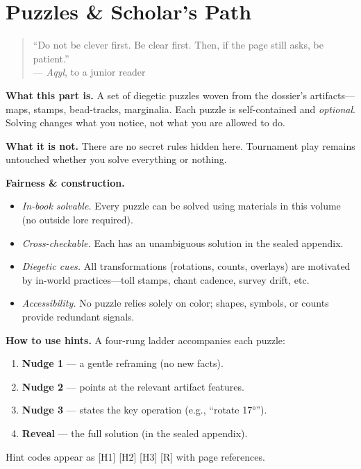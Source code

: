 \documentclass[11pt]{article}
\numberwithin{equation}{section} %
\theoremstyle{plain} %
\theoremstyle{definition} %
\theoremstyle{remark} %
\begin{document}
\section{Puzzles \& Scholar’s Path}
\label{part:puzzles}

\begin{quote}\small
“Do not be clever first. Be clear first. Then, if the page still asks, be patient.”\\
\hfill — \textit{Aqyl}, to a junior reader
\end{quote}

\noindent\textbf{What this part is.} A set of diegetic puzzles woven from the dossier’s artifacts—maps, stamps, bead-tracks, marginalia. Each puzzle is self-contained and \emph{optional}. Solving changes what you notice, not what you are allowed to do.

\medskip
\noindent\textbf{What it is not.} There are no secret rules hidden here. Tournament play remains untouched whether you solve everything or nothing.

\medskip
\noindent\textbf{Fairness \& construction.}
\begin{itemize}\setlength\itemsep{0.3em}
  \item \emph{In-book solvable.} Every puzzle can be solved using materials in this volume (no outside lore required).
  \item \emph{Cross-checkable.} Each has an unambiguous solution in the sealed appendix.
  \item \emph{Diegetic cues.} All transformations (rotations, counts, overlays) are motivated by in-world practices—toll stamps, chant cadence, survey drift, etc.
  \item \emph{Accessibility.} No puzzle relies solely on color; shapes, symbols, or counts provide redundant signals.
\end{itemize}

\medskip
\noindent\textbf{How to use hints.} A four-rung ladder accompanies each puzzle:
\begin{enumerate}\setlength\itemsep{0.25em}
  \item \textbf{Nudge 1} — a gentle reframing (no new facts).
  \item \textbf{Nudge 2} — points at the relevant artifact features.
  \item \textbf{Nudge 3} — states the key operation (e.g., “rotate 17°”).
  \item \textbf{Reveal} — the full solution (in the sealed appendix).
\end{enumerate}
Hint codes appear as \textsc{[H1] [H2] [H3] [R]} with page references.
\end{document}
